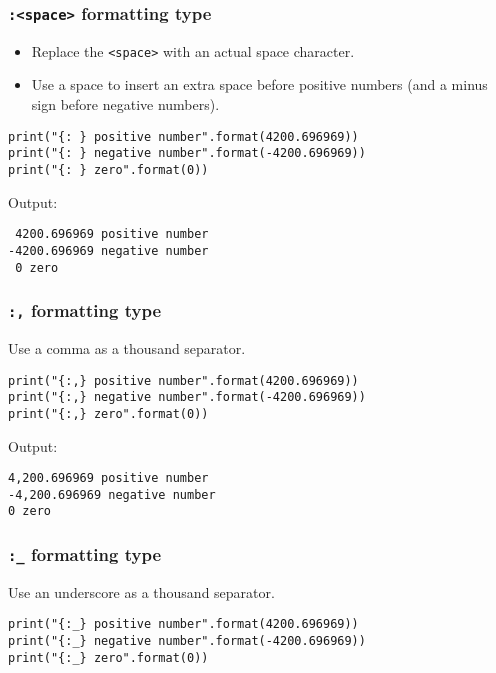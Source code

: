 \documentclass[11pt]{article}
\begin{document}
\subsubsection{\texttt{:<space>} formatting type}
\label{sec:org101b531}
\begin{itemize}
\item Replace the \texttt{<space>} with an actual space character.
\item Use a space to insert an extra space before positive numbers (and a minus sign before negative numbers).
\end{itemize}

\begin{verbatim}
print("{: } positive number".format(4200.696969))
print("{: } negative number".format(-4200.696969))
print("{: } zero".format(0))
\end{verbatim}

 \noindent Output:

\begin{verbatim}
 4200.696969 positive number
-4200.696969 negative number
 0 zero
\end{verbatim}

\subsubsection{\texttt{:,} formatting type}
\label{sec:orga317882}
Use a comma as a thousand separator.

\begin{verbatim}
print("{:,} positive number".format(4200.696969))
print("{:,} negative number".format(-4200.696969))
print("{:,} zero".format(0))
\end{verbatim}

 \noindent Output:

\begin{verbatim}
4,200.696969 positive number
-4,200.696969 negative number
0 zero
\end{verbatim}

\subsubsection{\texttt{:\_} formatting type}
\label{sec:org7633537}
Use an underscore as a thousand separator.

\begin{verbatim}
print("{:_} positive number".format(4200.696969))
print("{:_} negative number".format(-4200.696969))
print("{:_} zero".format(0))
\end{verbatim}
\end{document}
